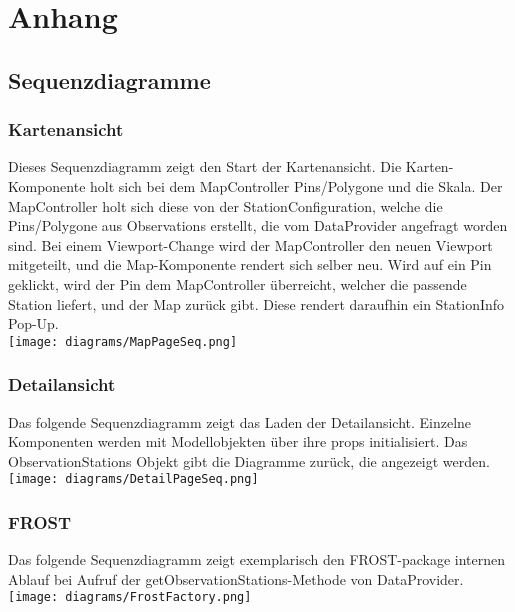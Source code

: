 \section{Anhang}
\subsection{Sequenzdiagramme}
\subsubsection*{Kartenansicht}
Dieses Sequenzdiagramm zeigt den Start der \gls{Kartenansicht}. Die Karten-Komponente holt sich bei dem MapController Pins/Polygone und die Skala. Der MapController holt sich diese von der StationConfiguration, welche die Pins/Polygone aus Observations erstellt, die vom DataProvider angefragt worden sind. Bei einem Viewport-Change wird der MapController den neuen Viewport mitgeteilt, und die Map-Komponente rendert sich selber neu. Wird auf ein Pin geklickt, wird der Pin dem MapController überreicht, welcher die passende Station liefert, und der Map zurück gibt. Diese rendert daraufhin ein StationInfo Pop-Up.
\\
\texttt{[image: diagrams/MapPageSeq.png]}

\newpage
\subsubsection*{Detailansicht}
Das folgende Sequenzdiagramm zeigt das Laden der \gls{Detailansicht}. Einzelne Komponenten werden mit Modellobjekten über ihre props initialisiert. Das ObservationStations Objekt gibt die Diagramme zurück, die angezeigt werden.\\


\texttt{[image: diagrams/DetailPageSeq.png]}

\newpage
\subsubsection*{FROST}
Das folgende Sequenzdiagramm zeigt exemplarisch den FROST-package internen Ablauf bei Aufruf der getObservationStations-Methode von DataProvider.\\


\texttt{[image: diagrams/FrostFactory.png]}